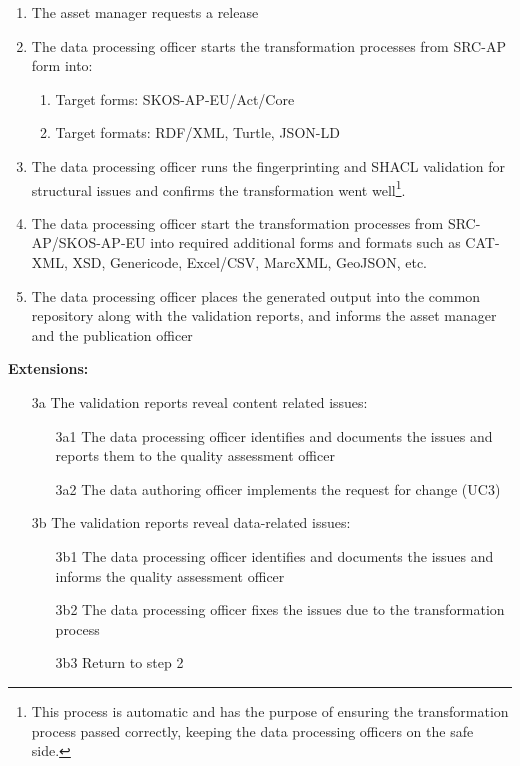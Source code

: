 	\begin{enumerate}
		\item The asset manager requests a release
		\item The data processing officer starts the transformation processes from SRC-AP form into:
		\begin{enumerate}
			\item Target forms: SKOS-AP-EU/Act/Core
			\item Target formats: RDF/XML, Turtle, JSON-LD
		\end{enumerate}		
		\item The data processing officer runs the fingerprinting and SHACL validation for structural issues and confirms the transformation went well\footnote{This process is automatic and has the purpose of ensuring the transformation process passed correctly, keeping the data processing officers on the safe side.}.
		\item The data processing officer start the transformation processes from SRC-AP/SKOS-AP-EU into required additional forms and formats such as CAT-XML, XSD, Genericode, Excel/CSV, MarcXML, GeoJSON, etc.
		\item The data processing officer places the generated output into the common repository along with the validation reports, and informs the asset manager and the publication officer		
	\end{enumerate}
	
	\textbf{Extensions:}
	\begin{enumerate}
		\item [3a] The validation reports reveal content related issues:
		\begin{enumerate}
			\item [3a1] The data processing officer identifies and documents the issues and reports them to the quality assessment officer
			\item [3a2] The data authoring officer implements the request for change (UC3)
		\end{enumerate}

		\item [3b] The validation reports reveal data-related issues:
		\begin{enumerate}
			\item [3b1] The data processing officer identifies and documents the issues and informs the quality assessment officer
			\item [3b2] The data processing officer fixes the issues due to the transformation process
			\item [3b3] Return to step 2
		\end{enumerate}		
	\end{enumerate}
	

